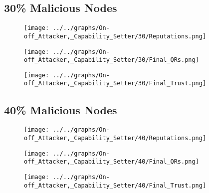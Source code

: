\begin{minipage}[t]{0.49\columnwidth}
\subsection*{30\% Malicious Nodes}
    \begin{figure}[H]
        \centering
        \texttt{[image: ../../graphs/On-off\_Attacker,\_Capability\_Setter/30/Reputations.png]}
    \end{figure}
    \begin{figure}[H]
        \centering
        \texttt{[image: ../../graphs/On-off\_Attacker,\_Capability\_Setter/30/Final\_QRs.png]}
    \end{figure}
\end{minipage}
\begin{minipage}[t]{0.49\columnwidth}
    \begin{figure}[H]
        \centering
        \texttt{[image: ../../graphs/On-off\_Attacker,\_Capability\_Setter/30/Final\_Trust.png]}
    \end{figure}
\end{minipage}

\begin{minipage}[t]{0.49\columnwidth}
\subsection*{40\% Malicious Nodes}
    \begin{figure}[H]
        \centering
        \texttt{[image: ../../graphs/On-off\_Attacker,\_Capability\_Setter/40/Reputations.png]}
    \end{figure}
    \begin{figure}[H]
        \centering
        \texttt{[image: ../../graphs/On-off\_Attacker,\_Capability\_Setter/40/Final\_QRs.png]}
    \end{figure}
\end{minipage}
\begin{minipage}[t]{0.49\columnwidth}
    \begin{figure}[H]
        \centering
        \texttt{[image: ../../graphs/On-off\_Attacker,\_Capability\_Setter/40/Final\_Trust.png]}
    \end{figure}
\end{minipage}

